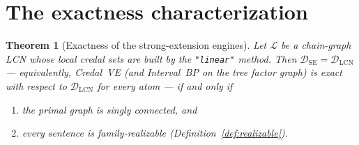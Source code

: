 \documentclass[11pt]{article}
\newtheorem{theorem}{Theorem}
\newcommand{\DSE}{\mathcal{D}_{\mathrm{SE}}}
\newcommand{\DLCN}{\mathcal{D}_{\mathrm{LCN}}}
\begin{document}
\section{The exactness characterization}\label{sec:theorem}

\begin{theorem}[Exactness of the strong-extension engines]\label{thm:main}
Let $\mathcal L$ be a chain-graph LCN whose local credal sets are built by the \texttt{"linear"}
method. Then $\DSE=\DLCN$ --- equivalently, Credal~VE (and Interval~BP on the tree factor graph) is
exact with respect to $\DLCN$ for every atom --- \emph{if and only if}
\begin{enumerate}
  \item[\textup{(i)}] the primal graph is singly connected, and
  \item[\textup{(ii)}] every sentence is family-realizable (Definition~\ref{def:realizable}).
\end{enumerate}
\end{theorem}
\end{document}
